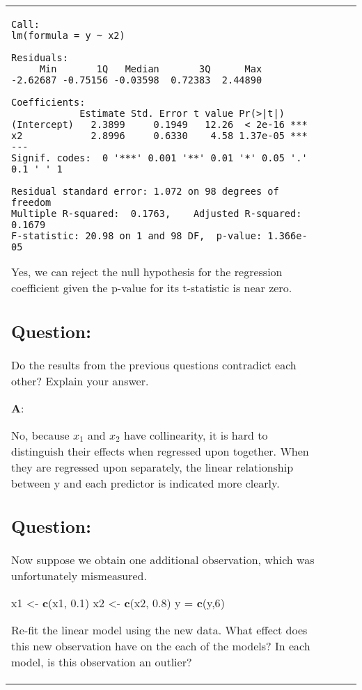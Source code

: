 \documentclass[12pt,]{article}
\newenvironment{Shaded}{\begin{snugshade}}{\end{snugshade}}
\newcommand{\DecValTok}[1]{\textcolor[rgb]{0.00,0.00,0.81}{#1}}
\newcommand{\FloatTok}[1]{\textcolor[rgb]{0.00,0.00,0.81}{#1}}
\newcommand{\KeywordTok}[1]{\textcolor[rgb]{0.13,0.29,0.53}{\textbf{#1}}}
\newcommand{\NormalTok}[1]{#1}
\newcommand{\StringTok}[1]{\textcolor[rgb]{0.31,0.60,0.02}{#1}}
\begin{document}
\begin{tabularx}{0.5\textwidth}{p{} p{} p{} p{}}
\begin{verbatim}
Call:
lm(formula = y ~ x2)

Residuals:
     Min       1Q   Median       3Q      Max 
-2.62687 -0.75156 -0.03598  0.72383  2.44890 

Coefficients:
            Estimate Std. Error t value Pr(>|t|)    
(Intercept)   2.3899     0.1949   12.26  < 2e-16 ***
x2            2.8996     0.6330    4.58 1.37e-05 ***
---
Signif. codes:  0 '***' 0.001 '**' 0.01 '*' 0.05 '.' 0.1 ' ' 1

Residual standard error: 1.072 on 98 degrees of freedom
Multiple R-squared:  0.1763,    Adjusted R-squared:  0.1679 
F-statistic: 20.98 on 1 and 98 DF,  p-value: 1.366e-05
\end{verbatim}

Yes, we can reject the null hypothesis for the regression coefficient
given the p-value for its t-statistic is near zero.

\hypertarget{question-23}{%
\subsection{Question:}\label{question-23}}

Do the results from the previous questions contradict each other?
Explain your answer.

\textbf{A}:

No, because \(x_1\) and \(x_2\) have collinearity, it is hard to
distinguish their effects when regressed upon together. When they are
regressed upon separately, the linear relationship between y and each
predictor is indicated more clearly.

\hypertarget{question-24}{%
\subsection{Question:}\label{question-24}}

Now suppose we obtain one additional observation, which was
unfortunately mismeasured.

\begin{Shaded}
\begin{Highlighting}[]
\NormalTok{x1 <-}\StringTok{ }\KeywordTok{c}\NormalTok{(x1, }\FloatTok{0.1}\NormalTok{)}
\NormalTok{x2 <-}\StringTok{ }\KeywordTok{c}\NormalTok{(x2, }\FloatTok{0.8}\NormalTok{)}
\NormalTok{y =}\StringTok{ }\KeywordTok{c}\NormalTok{(y,}\DecValTok{6}\NormalTok{)}
\end{Highlighting}
\end{Shaded}

Re-fit the linear model using the new data. What effect does this new
observation have on the each of the models? In each model, is this
observation an outlier?


\end{tabularx}
\end{document}
